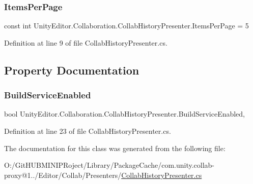 \subsubsection{\texorpdfstring{ItemsPerPage}{ItemsPerPage}}
{\footnotesize\ttfamily const int Unity\+Editor.\+Collaboration.\+Collab\+History\+Presenter.\+Items\+Per\+Page = 5}



Definition at line 9 of file Collab\+History\+Presenter.\+cs.



\subsection{Property Documentation}
\mbox{\label{class_unity_editor_1_1_collaboration_1_1_collab_history_presenter_a8a575bcd378e10cd9f3a3c84266933fd}} 
\subsubsection{\texorpdfstring{BuildServiceEnabled}{BuildServiceEnabled}}
{\footnotesize\ttfamily bool Unity\+Editor.\+Collaboration.\+Collab\+History\+Presenter.\+Build\+Service\+Enabled\hspace{0.3cm}{\ttfamily [get]}, {\ttfamily [set]}}



Definition at line 23 of file Collab\+History\+Presenter.\+cs.



The documentation for this class was generated from the following file\+:\begin{DoxyCompactItemize}
\item 
O\+:/\+Git\+H\+U\+B\+M\+I\+N\+I\+P\+Roject/\+Library/\+Package\+Cache/com.\+unity.\+collab-\/proxy@1../\+Editor/\+Collab/\+Presenters/\mbox{\hyperlink{_collab_history_presenter_8cs}{Collab\+History\+Presenter.\+cs}}\end{DoxyCompactItemize}
